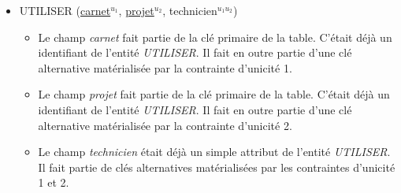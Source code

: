 \documentclass[a4paper]{article}
\newcommand{\relat}[1]{\textsc{#1}}
\newcommand{\attr}[1]{#1}
\newcommand{\prim}[1]{\uline{#1}}
\begin{document}
\begin{itemize}
  \item \relat{UTILISER} (\prim{carnet}$^{u_1}$, \prim{projet}$^{u_2}$, \attr{technicien}$^{u_1 u_2}$)
  \begin{itemize}
    \item Le champ \emph{carnet} fait partie de la clé primaire de la table. C'était déjà un identifiant de l'entité \emph{UTILISER}. Il fait en outre partie d'une clé alternative matérialisée par la contrainte d'unicité 1.
    \item Le champ \emph{projet} fait partie de la clé primaire de la table. C'était déjà un identifiant de l'entité \emph{UTILISER}. Il fait en outre partie d'une clé alternative matérialisée par la contrainte d'unicité 2.
    \item Le champ \emph{technicien} était déjà un simple attribut de l'entité \emph{UTILISER}. Il fait partie de clés alternatives matérialisées par les contraintes d'unicité 1 et 2.
  \end{itemize}

\end{itemize}
\end{document}
